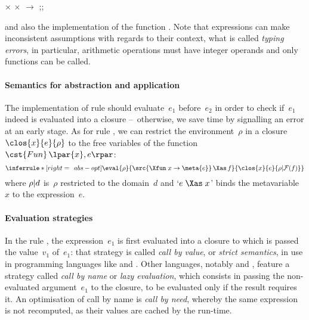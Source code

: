 \noindent\Xtype {} \equal {} \Xof {} \vbar
{} \Xof {} \(\times\)  \(\times\)
\lpar{} $\rightarrow$ \rpar\textsf{;;}{}

\bigskip

\noindent and also the implementation of the \OCaml function . Note
that expressions can make inconsistent assumptions with regards to
their context, what is called \emph{typing errors}, in particular,
arithmetic operations must have integer operands and only functions
can be called.

\paragraph{Semantics for abstraction and application}

The implementation of rule  should evaluate~$e_1$
before~$e_2$ in order to check if~$e_1$ indeed is evaluated into a
closure --~otherwise, we save time by signalling an error at an early
stage. As for rule , we can restrict the
environment~$\rho$ in a closure $\clos{x}{e}{\rho}$ to the free
variables of the function $\cst{Fun} \, \lpar{x},e\rpar$:
\begin{equation*}
\inferrule*[right=\;\, abs-opt]
     {\eval{\rho}
           {\src{\Xfun \; x \rightarrow \meta{e}} \, \Xas \, f}
           {\clos{x}{e}{\rho\arrowvert\mathcal{F}(f)}}}
     {}
\end{equation*}
where \(\rho \arrowvert d\) is~\(\rho\) restricted to the domain~\(d\)
and `\(e \; \Xas \; x\)' binds the metavariable~\(x\) to the
expression~\(e\).

\paragraph{Evaluation strategies}

In the rule , the expression~\(e_1\) is first
evaluated into a closure to which is passed the value~\(v_1\)
of~\(e_1\): that strategy is called \emph{call by value}, or
\emph{strict semantics}, in use in programming languages like \OCaml
and \Java. Other languages, notably \Haskell and \Clean, feature a
strategy called \emph{call by name} or \emph{lazy evaluation}, which
consists in passing the non\hyp{}evaluated argument~\(e_1\) to the
closure, to be evaluated only if the result requires it. An
optimisation of call by name is \emph{call by need}, whereby the same
expression is not recomputed, as their values are cached by the
run\hyp{}time.

